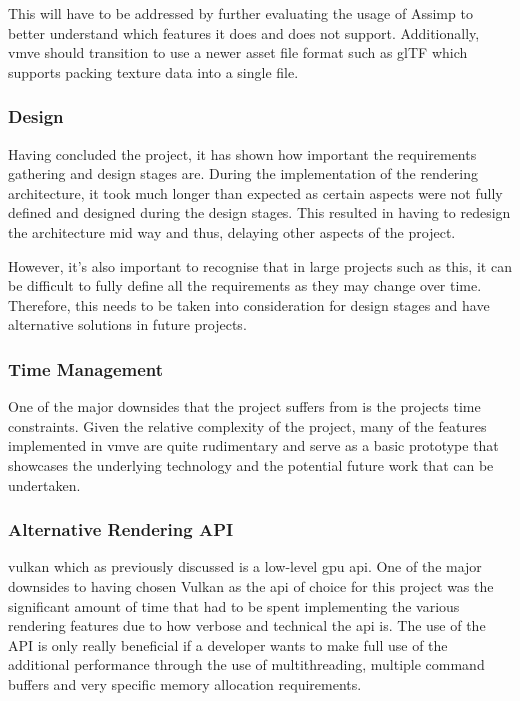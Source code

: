 \documentclass[11pt]{article}
\begin{document}
This will have to be addressed by further evaluating the usage of Assimp to
better understand which features it does and does not support. Additionally,
\gls*{vmve} should transition to use a newer asset file format such as glTF
which supports packing texture data into a single file.


\subsubsection{Design}
Having concluded the project, it has shown how important the requirements
gathering and design stages are. During the implementation of the rendering
architecture, it took much longer than expected as certain aspects were not
fully defined and designed during the design stages. This resulted in having to
redesign the architecture mid way and thus, delaying other aspects of the
project.

However, it's also important to recognise that in large projects such as this,
it can be difficult to fully define all the requirements as they may change over
time. Therefore, this needs to be taken into consideration for design stages and
have alternative solutions in future projects.

\subsubsection{Time Management}
One of the major downsides that the project suffers from is the projects time
constraints. Given the relative complexity of the project, many of the features
implemented in \gls*{vmve} are quite rudimentary and serve as a basic prototype
that showcases the underlying technology and the potential future work that can
be undertaken.

\subsubsection{Alternative Rendering API}
\gls*{vulkan} which as previously discussed is a low-level \gls*{gpu}
\gls*{api}. One of the major downsides to having chosen Vulkan as the \gls*{api}
of choice for this project was the significant amount of time that had to be
spent implementing the various rendering features due to how verbose and
technical the \gls*{api} is. The use of the API is only really beneficial if a
developer wants to make full use of the additional performance through the use
of multithreading, multiple command buffers and very specific memory allocation
requirements.
\end{document}
